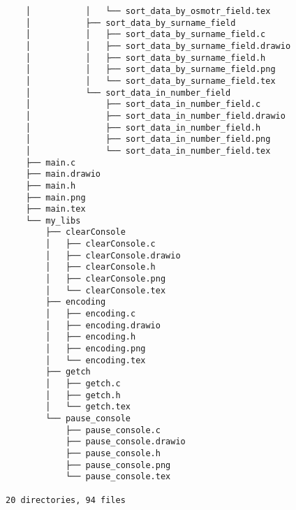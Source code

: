 \begin{verbatim}
    │           │   └── sort_data_by_osmotr_field.tex
    │           ├── sort_data_by_surname_field
    │           │   ├── sort_data_by_surname_field.c
    │           │   ├── sort_data_by_surname_field.drawio
    │           │   ├── sort_data_by_surname_field.h
    │           │   ├── sort_data_by_surname_field.png
    │           │   └── sort_data_by_surname_field.tex
    │           └── sort_data_in_number_field
    │               ├── sort_data_in_number_field.c
    │               ├── sort_data_in_number_field.drawio
    │               ├── sort_data_in_number_field.h
    │               ├── sort_data_in_number_field.png
    │               └── sort_data_in_number_field.tex
    ├── main.c
    ├── main.drawio
    ├── main.h
    ├── main.png
    ├── main.tex
    └── my_libs
        ├── clearConsole
        │   ├── clearConsole.c
        │   ├── clearConsole.drawio
        │   ├── clearConsole.h
        │   ├── clearConsole.png
        │   └── clearConsole.tex
        ├── encoding
        │   ├── encoding.c
        │   ├── encoding.drawio
        │   ├── encoding.h
        │   ├── encoding.png
        │   └── encoding.tex
        ├── getch
        │   ├── getch.c
        │   ├── getch.h
        │   └── getch.tex
        └── pause_console
            ├── pause_console.c
            ├── pause_console.drawio
            ├── pause_console.h
            ├── pause_console.png
            └── pause_console.tex

20 directories, 94 files
\end{verbatim}